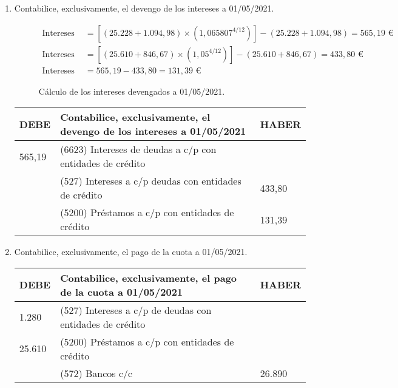 \begin{enumerate}[label=\alph*)]
\item Contabilice, exclusivamente, el devengo de los intereses a 01/05/2021.

\begin{figure}[H]
    \begin{align*}
        \text{Intereses totales} &= \left[\left(25.228 + 1.094,98\right) \times \left(1,065807^{4/12}\right)\right] - \left(25.228 + 1.094,98\right) = 565,19 \text{ €} \\
        \text{Intereses explícitos} &= \left[\left(25.610 + 846,67\right) \times \left(1,05^{4/12}\right)\right] - \left(25.610 + 846,67\right) = 433,80 \text{ €} \\
        \text{Intereses implícitos} &= 565,19 - 433,80 = 131,39 \text{ €}
    \end{align*}
    \caption{Cálculo de los intereses devengados a 01/05/2021.}
    \label{fig:intereses_devengados_ejercicio4_2021}
\end{figure}

\begin{table}[H]
\centering
\begin{tabular}{|p{2cm}|p{8cm}|p{2cm}|}
\hline
\rowcolor{blue!30}
\textbf{DEBE} & \textbf{Contabilice, exclusivamente, el devengo de los intereses a 01/05/2021} & \textbf{HABER} \\ \hline
565,19 & (6623) Intereses de deudas a c/p con entidades de crédito & \\ \hline
& (527) Intereses a c/p deudas con entidades de crédito & 433,80 \\ \hline
& (5200) Préstamos a c/p con entidades de crédito & 131,39 \\ \hline
\end{tabular}
\end{table}

\item Contabilice, exclusivamente, el pago de la cuota a 01/05/2021.

\begin{table}[H]
\centering
\begin{tabular}{|p{2cm}|p{8cm}|p{2cm}|}
\hline
\rowcolor{blue!30}
\textbf{DEBE} & \textbf{Contabilice, exclusivamente, el pago de la cuota a 01/05/2021} & \textbf{HABER} \\ \hline
1.280 & (527) Intereses a c/p de deudas con entidades de crédito & \\ \hline
25.610 & (5200) Préstamos a c/p con entidades de crédito & \\ \hline
& (572) Bancos c/c & 26.890 \\ \hline
\end{tabular}
\end{table}

\end{enumerate}

